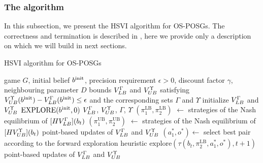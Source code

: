 \documentclass[../main.tex]{subfiles}
\begin{document}
\subsubsection{The algorithm}\label{standard:osposg:hsvi:alg}
In this subsection, we present the HSVI algorithm  for OS-POSGs.
The correctness and termination is described in \cite{poposgsthesis}, here we provide only a description on which we will build in next sections.
\begin{algorithm}
    \caption{HSVI algorithm for OS-POSGs}
    \label{standard:osposg:hsvi:alg:alg}
    \begin{algorithmic}[1]
        \Require game $G$, initial belief $b^{\text{init}}$, precision requirement $\epsilon > 0$, discount factor $\gamma$, neighbouring parameter $D$
        \Ensure bounds $V_{LB}^{\Gamma}$ and $V_{UB}^{\Upsilon}$ satisfying $V_{UB}^{\Upsilon}(b^{\text{init}}) - V_{LB}^{\Gamma}(b^{\text{init}}) \leq \epsilon$ and the corresponding sets $\Gamma$ and $\Upsilon$
        \State initialize $V_{LB}^{\Gamma}$ and $V_{UB}^{\Upsilon}$ 
            \State $\text{EXPLORE}(b^{\text{init}}, 0)$
        \EndWhile
        \State\Return $V_{LB}^{\Gamma}$, $V_{UB}^{\Upsilon}$, $\Gamma$, $\Upsilon$
            \State $(\pi_1^{\text{LB}}, \pi_2^{\text{LB}})$ $\leftarrow$ strategies of the Nash equilibrium of $[HV_{LB}^{\Gamma}](b_t)$
            \State $(\pi_1^{\text{UB}}, \pi_2^{\text{UB}})$ $\leftarrow$ strategies of the Nash equilibrium of $[HV_{UB}^{\Upsilon}](b_t)$
            \State point-based updates of $V_{LB}^{\Gamma}$ and $V_{UB}^{\Upsilon}$ 
            \State $(a_1^*, o^*) \leftarrow $ select best pair according to the forward exploration heuristic
                \State $\text{explore}(\tau(b_t, \pi_2^{\text{LB}}, a_1^*, o^*), t + 1)$
                \State point-based updates of $V_{LB}^{\Gamma}$ and $V_{UB}^{\Upsilon}$ 
            \EndIf
        \EndProcedure
    \end{algorithmic}
\end{algorithm}
\end{document}
